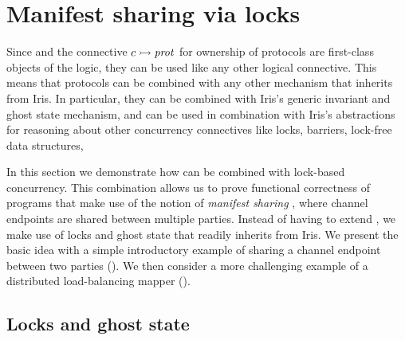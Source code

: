\section{Manifest sharing via locks}
\label{sec:integration}

Since \pname and the connective $c \rightarrowtail \mathit{prot}$ for ownership of protocols
are first-class objects of the \lname logic, they can be used like any other
logical connective.
This means that protocols can be combined with any other
mechanism that \lname inherits from Iris.
In particular, they can be combined with Iris's generic invariant and ghost
state mechanism, and can be used in combination with Iris's
abstractions for reasoning about other concurrency connectives like locks,
barriers, lock-free data structures, \etc

In this section we demonstrate how \pname can be combined with lock-based
concurrency.
This combination allows us to prove functional correctness of programs that
make use of the notion of \emph{manifest sharing} \cite{balzer-PACMPL2017, balzer-ESOP2019},
where channel endpoints are shared between multiple parties.
Instead of having to extend \lname, we make use of locks and ghost state that
\lname readily inherits from Iris.
We present the basic idea with a simple introductory example of sharing a channel
endpoint between two parties ().
We then consider a more challenging example of a distributed load-balancing
mapper ().

\subsection{Locks and ghost state}
\label{sec:locks}

\newcommand{\locksfig}{
\begin{figure}
\begin{align*}
\hoare
  {\ipropC}
  {&\newlock}
  {\Ret\lockvar. \islock \lockvar \ipropC}
  \tagH{Ht-new-lock} \\
\hoare
  {\islock \lockvar \ipropC}
  {&\acquire \lockvar}
  \ipropC
  \tagH{Ht-acquire} \\
\hoare
  {\islock \lockvar \ipropC * \ipropC}
  {&\release \lockvar}
  \TRUE
  \tagH{Ht-release} \\
\islock \lockvar \ipropC \wand\ &
  \islock \lockvar \ipropC * \islock \lockvar \ipropC
  \tagH{Lock-dup}
\end{align*}
\caption{The rules \lname inherits from Iris for locks.}
\label{fig:locks}
\end{figure}}

